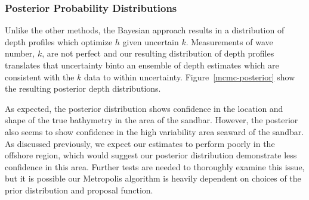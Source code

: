 \subsubsection{Posterior Probability Distributions}

Unlike the other methods, the Bayesian approach results in a distribution of depth profiles which optimize $h$ given uncertain $k$. Measurements of wave number, $k$, are not perfect and our resulting distribution of depth profiles translates that uncertainty binto an ensemble of depth estimates which are consistent with the $k$ data to within uncertainty. Figure~\ref{mcmc-posterior} show the resulting posterior depth distributions. 

As expected, the posterior distribution shows confidence in the location and shape of the true bathymetry in the area of the sandbar. However, the posterior also seems to show confidence in the high variability area seaward of the sandbar. As discussed previously, we expect our estimates to perform poorly in the offshore region, which would suggest our posterior distribution demonstrate less confidence in this area. Further tests are needed to thoroughly examine this issue, but it is possible our Metropolis algorithm is heavily dependent on choices of the prior distribution and proposal function. 


